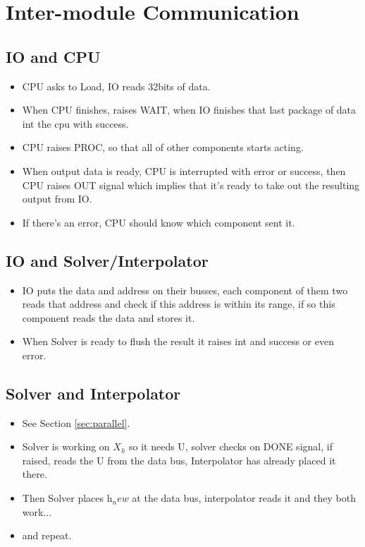 \documentclass[12pt]{report}
\begin{document}
\section{Inter-module Communication}

\subsection{IO and CPU}
\begin{itemize}
    \item CPU asks to Load, IO reads 32bits of data.
    \item When CPU finishes, raises WAIT, when IO finishes that last package of data int the cpu with success.
    \item CPU raises PROC, so that all of other components starts acting.
    \item When output data is ready, CPU is interrupted with error or success, then CPU raises OUT signal which implies that it's ready to take out the resulting output from IO.
    \item If there's an error, CPU should know which component sent it.
\end{itemize}

\subsection{IO and Solver/Interpolator}
\begin{itemize}
    \item IO puts the data and address on their busses, each component of them two reads that address and check if this address is within its range, if so this component reads the data and stores it.
    \item When Solver is ready to flush the result it raises int and success or even error.
\end{itemize}

\subsection{Solver and Interpolator}
\begin{itemize}
    \item See Section \ref{sec:parallel}.
    \item Solver is working on $X_h$ so it needs U, solver checks on DONE signal, if raised, reads the U from the data bus, Interpolator has already placed it there.
    \item Then Solver places h$_new$ at the data bus, interpolator reads it and they both work...
    \item and repeat.
\end{itemize}
\end{document}
